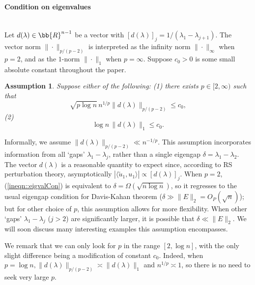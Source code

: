 \documentclass[12pt]{article}%
\theoremstyle{plain}%
\newtheorem{assmp}{Assumption}[section]
\theoremstyle{remark}
\begin{document}
\paragraph{Condition on eigenvalues} ~\\
Let $d(\lambda) \in \bb{R}^{n-1}$ be a vector with $[d(\lambda)]_j= 1 / (\lambda_1-\lambda_{j+1})$. The vector norm $\| \cdot \|_{p/(p-2)}$ is interpreted as the infinity norm $\| \cdot \|_\infty$ when $p=2$, and as the $1$-norm $\| \cdot \|_1$ when $p = \infty$. Suppose $c_0>0$ is some small absolute constant throughout the paper. 

\begin{assmp}\label{assmp::lambda}
Suppose either of the following: (1) there exists $p \in [2,\infty)$ such that 
\begin{equation}\label{ineqn::eigvalCon}
\sqrt{p\log n}\, n^{1/p}\| d(\lambda) \|_{p/(p-2)} \le c_0, 
\end{equation}
(2)
\begin{equation}\label{ineqn::eigvalCon2}
\log n \,\| d(\lambda) \|_{1} \le c_0.
\end{equation}
\end{assmp}

Informally, we assume $\| d(\lambda) \|_{p/(p-2)} \ll n^{-1/p}$. This assumption incorporates information from all `gaps' $\lambda_1 - \lambda_j$, rather than a single eigengap $\delta = \lambda_1 - \lambda_2$. The vector $d(\lambda)$ is a reasonable quantity to expect since, according to RS perturbation theory, asymptotically $|\langle \tilde{u}_1, u_1 \rangle| \propto [d(\lambda)]_j$. When  $p = 2$, (\ref{ineqn::eigvalCon}) is equivalent to $\delta = \Omega( \sqrt{n \log n} )$, so it regresses to the usual eigengap condition for Davis-Kahan theorem ($\delta \gg \| E \|_2 = O_P(\sqrt{n})$); but for other choice of $p$, this assumption allows for more flexibility. When other `gaps' $\lambda_1 - \lambda_j$ ($j > 2$) are significantly larger, it is possible that $\delta \ll \| E \|_2$. We will soon discuss many interesting examples this assumption encompasses.

We remark that we can only look for $p$ in the range $[2, \log n]$, with the only slight difference being a modification of constant $c_0$. Indeed, when $p = \log n, \| d(\lambda) \|_{p/(p-2)} \asymp \| d(\lambda) \|_1$ and $n^{1/p} \asymp 1$, so there is no need to seek very large $p$.  



\end{document}
